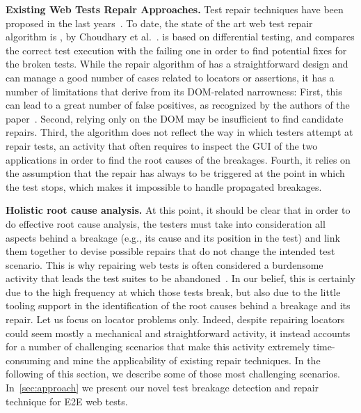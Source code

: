 \noindent
\textbf{Existing Web Tests Repair Approaches.} Test repair techniques have been proposed in the last years~\cite{Gao:2016:SGT:3046547.3046580,Daniel:2011:AGR:2002931.2002937,Daniel:2009:RSR:1747491.1747538,Daniel:2010:TRU:1831708.1831734,Choudhary:2011:WWA:2002931.2002935,Hammoudi-2016-FSE}. 
To date, the state of the art web test repair algorithm is \water, by Choudhary et al.~\cite{Choudhary:2011:WWA:2002931.2002935}. \water is based on differential testing, and compares the correct test execution with the failing one in order to find potential fixes for the broken tests. While the repair algorithm of \water has a straightforward design and can manage a good number of cases related to locators or assertions, it has a number of limitations that derive from its  DOM-related narrowness: First, this can lead to a great number of false positives, as recognized by the authors of the paper~\cite{Choudhary:2011:WWA:2002931.2002935}. Second, 
 relying only on the DOM may be insufficient to find candidate repairs. Third, the algorithm does not reflect the way in which testers attempt at repair tests, an activity that often requires to inspect the GUI of the two applications in order to find the root causes of the breakages. Fourth, it relies on the assumption that the repair has always to be triggered at the point in which the test stops, which makes it impossible to handle propagated breakages. %
 
\noindent
\textbf{Holistic root cause analysis.}
At this point, it should be clear that in order to do effective root cause analysis, the testers must take into consideration all aspects behind a breakage (e.g., its cause and its position in the test) and link them together to devise possible repairs that do not change the intended test scenario. This is why repairing web tests is often considered a burdensome activity that leads the test suites to be abandoned~\cite{Christophe2014}. In our belief, this is certainly due to the high frequency at which those tests break, but also due to the little tooling support in the identification of the root causes behind a breakage and its repair.
%
Let us focus on locator problems only. Indeed, despite repairing locators could seem mostly a mechanical and straightforward activity, it instead accounts for a number of challenging scenarios that make this activity extremely time-consuming and mine the applicability of existing repair techniques. In the following of this section, we describe some of those most challenging scenarios. In~\autoref{sec:approach} we present our novel test breakage detection and repair technique for E2E web tests.

